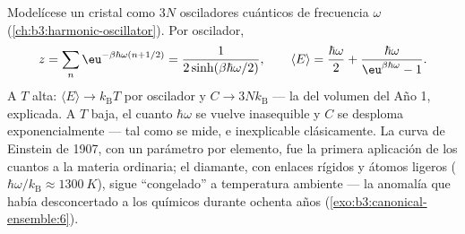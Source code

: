 \begin{example}\label{ex:b3:canonical-ensemble:einstein}
Modelícese un cristal como $3N$ osciladores cuánticos de frecuencia $\omega$
(\cref{ch:b3:harmonic-oscillator}). Por oscilador,
\[
z = \sum_n\eu^{-\beta\hbar\omega(n + 1/2)}
 = \frac{1}{2\sinh(\beta\hbar\omega/2)} , \qquad
\langle E\rangle = \frac{\hbar\omega}{2} +
\frac{\hbar\omega}{\eu^{\beta\hbar\omega} - 1} .
\]
A $T$ alta: $\langle E\rangle \to k_{\text{B}}T$ por oscilador y
$C \to 3Nk_{\text{B}}$ --- la  del volumen del Año 1,
explicada. A $T$ baja, el cuanto $\hbar\omega$ se vuelve
inasequible y $C$ se desploma exponencialmente --- tal como se mide, e
inexplicable clásicamente. La curva de Einstein de 1907, con un parámetro
por elemento, fue la primera aplicación de los cuantos a la materia
ordinaria; el diamante, con enlaces rígidos y átomos ligeros ($\hbar\omega/k_{\text{B}}
\approx \qty{1300}{K}$), sigue ``congelado'' a
temperatura ambiente --- la anomalía que había desconcertado a los químicos
durante ochenta años (\cref{exo:b3:canonical-ensemble:6}).
\end{example}


